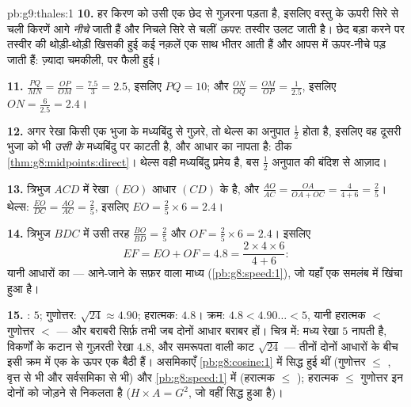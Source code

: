 \begin{solution}{pb:g9:thales:1}
\textbf{10.} हर किरण को उसी एक छेद से गुज़रना पड़ता है, इसलिए वस्तु
के ऊपरी सिरे से चली किरणें आगे \emph{नीचे} जाती हैं और निचले सिरे से
चलीं \emph{ऊपर}: तस्वीर उलट जाती है। छेद बड़ा करने पर तस्वीर की
थोड़ी-थोड़ी खिसकी हुई कई नक़लें एक साथ भीतर आती हैं और आपस में ऊपर-नीचे
पड़ जाती हैं: ज़्यादा चमकीली, पर फैली हुई।

\textbf{11.} $\frac{PQ}{MN} = \frac{OP}{OM} = \frac{7.5}{3}
= 2.5$, इसलिए $PQ = 10$; और $\frac{ON}{OQ} = \frac{OM}{OP} =
\frac{1}{2.5}$, इसलिए $ON = \frac{6}{2.5} = 2.4$।

\textbf{12.} अगर  रेखा किसी एक भुजा के मध्यबिंदु से गुज़रे, तो
थेल्स का अनुपात $\frac12$ होता है, इसलिए वह दूसरी भुजा को भी
\emph{उसी के} मध्यबिंदु पर काटती है, और   आधार का 
नापता है: ठीक \cref{thm:g8:midpoints:direct}। थेल्स वही मध्यबिंदु
प्रमेय है, बस $\frac12$ अनुपात की बंदिश से आज़ाद।

\textbf{13.} त्रिभुज $ACD$ में रेखा $(EO)$ आधार $(CD)$ के  है,
और $\frac{AO}{AC} = \frac{OA}{OA + OC} = \frac{4}{4 + 6} = \frac25$।
थेल्स: $\frac{EO}{DC} = \frac{AO}{AC} = \frac25$, इसलिए
$EO = \frac25 \times 6 = 2.4$।

\textbf{14.} त्रिभुज $BDC$ में उसी तरह $\frac{BO}{BD} = \frac25$ और
$OF = \frac25 \times 6 = 2.4$। इसलिए
\[
EF = EO + OF = 4.8
= \frac{2 \times 4 \times 6}{4 + 6} :
\]
यानी आधारों का  --- आने-जाने के सफ़र वाला माध्य
(\cref{pb:g8:speed:1}), जो यहाँ एक समलंब में खिंचा हुआ है।

\textbf{15.} : $5$; गुणोत्तर: $\sqrt{24} \approx 4.90$;
हरात्मक: $4.8$। क्रम: $4.8 < 4.90\ldots < 5$, यानी हरात्मक $<$
गुणोत्तर $<$  --- और बराबरी सिर्फ़ तभी जब दोनों आधार बराबर हों।
चित्र में: मध्य रेखा $5$ नापती है, विकर्णों के कटान से गुज़रती 
रेखा $4.8$, और समरूपता वाली काट $\sqrt{24}$ --- तीनों दोनों आधारों के
बीच इसी क्रम में एक के ऊपर एक बैठी हैं। असमिकाएँ
\cref{pb:g8:cosine:1} में सिद्ध हुई थीं (गुणोत्तर $\leq$ ,
वृत्त से भी और सर्वसमिका से भी) और \cref{pb:g8:speed:1} में (हरात्मक
$\leq$ ); हरात्मक $\leq$ गुणोत्तर इन दोनों को जोड़ने से निकलता
है ($H \times A = G^2$, जो वहीं सिद्ध हुआ है)।

\end{solution}
